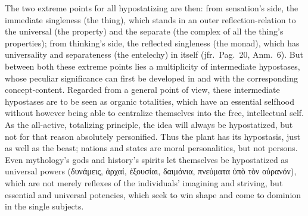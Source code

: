 \documentclass[12pt]{book}
\begin{document}
The two extreme points for all hypostatizing are then: from sensation's
side, the immediate singleness (the thing), which stands in an outer
reflection-relation to the universal (the property) and the separate (the
complex of all the thing's properties); from thinking's side, the reflected
singleness (the monad), which has universality and separateness (the
entelechy) in itself (jfr.\ Pag.\ 20, Anm.\ 6). But between both these
extreme points lies a multiplicity of intermediate hypostases, whose
peculiar significance can first be developed in and with the corresponding
concept-content. Regarded from a general point of view, these intermediate
hypostases are to be seen as organic totalities, which have an essential
selfhood without however being able to centralize themselves into the free,
intellectual self. As the all-active, totalizing principle, the idea will
always be hypostatized, but not for that reason absolutely personified. Thus
the plant has its hypostasis, just as well as the beast; nations and states
are moral personalities, but not persons. Even mythology's gods and
history's spirits let themselves be hypostatized as universal powers
(δυνάμεις, ἀρχαί, ἐξουσίαι, δαιμόνια, πνεύματα ὑπὸ τὸν οὐρανόν), which are
not merely reflexes of the individuals' imagining and striving, but
essential and universal potencies, which seek to win shape and come to
dominion in the single subjects.
\end{document}
